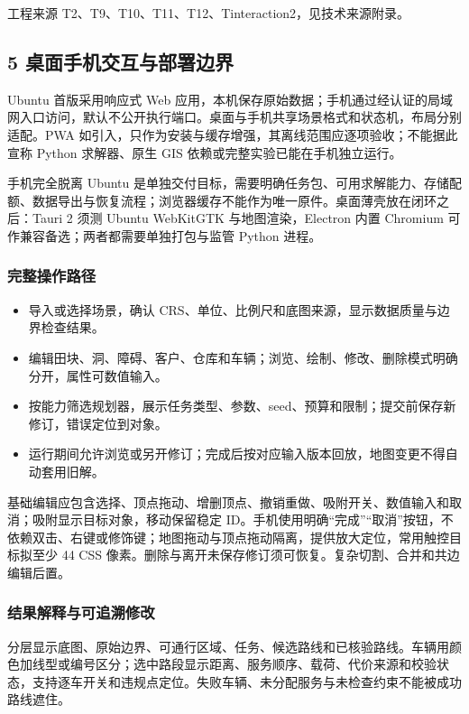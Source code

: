 \documentclass[11pt,a4paper]{article}
\newcommand{\bodytext}[1]{#1\par}
\newcommand{\sourcetext}[1]{{\fontsize{9.2}{14}\selectfont\color{Muted}#1\par}}
\begin{document}
\sourcetext{工程来源 T2、T9、T10、T11、T12、Tinteraction2，见技术来源附录。}
\subsection{5  桌面手机交互与部署边界}
\bodytext{Ubuntu 首版采用响应式 Web 应用，本机保存原始数据；手机通过经认证的局域网入口访问，默认不公开执行端口。桌面与手机共享场景格式和状态机，布局分别适配。PWA 如引入，只作为安装与缓存增强，其离线范围应逐项验收；不能据此宣称 Python 求解器、原生 GIS 依赖或完整实验已能在手机独立运行。}
\bodytext{手机完全脱离 Ubuntu 是单独交付目标，需要明确任务包、可用求解能力、存储配额、数据导出与恢复流程；浏览器缓存不能作为唯一原件。桌面薄壳放在闭环之后：Tauri 2 须测 Ubuntu WebKitGTK 与地图渲染，Electron 内置 Chromium 可作兼容备选；两者都需要单独打包与监管 Python 进程。}
\subsubsection{完整操作路径}
\begin{itemize}
\item 导入或选择场景，确认 CRS、单位、比例尺和底图来源，显示数据质量与边界检查结果。
\item 编辑田块、洞、障碍、客户、仓库和车辆；浏览、绘制、修改、删除模式明确分开，属性可数值输入。
\item 按能力筛选规划器，展示任务类型、参数、seed、预算和限制；提交前保存新修订，错误定位到对象。
\item 运行期间允许浏览或另开修订；完成后按对应输入版本回放，地图变更不得自动套用旧解。
\end{itemize}
\bodytext{基础编辑应包含选择、顶点拖动、增删顶点、撤销重做、吸附开关、数值输入和取消；吸附显示目标对象，移动保留稳定 ID。手机使用明确“完成”“取消”按钮，不依赖双击、右键或修饰键；地图拖动与顶点拖动隔离，提供放大定位，常用触控目标拟至少 44 CSS 像素。删除与离开未保存修订须可恢复。复杂切割、合并和共边编辑后置。}
\subsubsection{结果解释与可追溯修改}
\bodytext{分层显示底图、原始边界、可通行区域、任务、候选路线和已核验路线。车辆用颜色加线型或编号区分；选中路段显示距离、服务顺序、载荷、代价来源和校验状态，支持逐车开关和违规点定位。失败车辆、未分配服务与未检查约束不能被成功路线遮住。}
\end{document}
